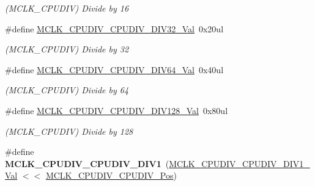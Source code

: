\begin{DoxyCompactItemize}
\begin{DoxyCompactList}\small\item\em (M\+C\+L\+K\+\_\+\+C\+P\+U\+D\+I\+V) Divide by 16 \end{DoxyCompactList}\item 
\hypertarget{group___s_a_m_l21___m_c_l_k_ga448a4c4d751ee50c5d4b5ba090e1b59a}{}\#define \hyperlink{group___s_a_m_l21___m_c_l_k_ga448a4c4d751ee50c5d4b5ba090e1b59a}{M\+C\+L\+K\+\_\+\+C\+P\+U\+D\+I\+V\+\_\+\+C\+P\+U\+D\+I\+V\+\_\+\+D\+I\+V32\+\_\+\+Val}~0x20ul\label{group___s_a_m_l21___m_c_l_k_ga448a4c4d751ee50c5d4b5ba090e1b59a}

\begin{DoxyCompactList}\small\item\em (M\+C\+L\+K\+\_\+\+C\+P\+U\+D\+I\+V) Divide by 32 \end{DoxyCompactList}\item 
\hypertarget{group___s_a_m_l21___m_c_l_k_gaac6c3fe67fb4444a6514401b65749a0e}{}\#define \hyperlink{group___s_a_m_l21___m_c_l_k_gaac6c3fe67fb4444a6514401b65749a0e}{M\+C\+L\+K\+\_\+\+C\+P\+U\+D\+I\+V\+\_\+\+C\+P\+U\+D\+I\+V\+\_\+\+D\+I\+V64\+\_\+\+Val}~0x40ul\label{group___s_a_m_l21___m_c_l_k_gaac6c3fe67fb4444a6514401b65749a0e}

\begin{DoxyCompactList}\small\item\em (M\+C\+L\+K\+\_\+\+C\+P\+U\+D\+I\+V) Divide by 64 \end{DoxyCompactList}\item 
\hypertarget{group___s_a_m_l21___m_c_l_k_ga1823f80244b12bdfd6a2c0b2b5aad95c}{}\#define \hyperlink{group___s_a_m_l21___m_c_l_k_ga1823f80244b12bdfd6a2c0b2b5aad95c}{M\+C\+L\+K\+\_\+\+C\+P\+U\+D\+I\+V\+\_\+\+C\+P\+U\+D\+I\+V\+\_\+\+D\+I\+V128\+\_\+\+Val}~0x80ul\label{group___s_a_m_l21___m_c_l_k_ga1823f80244b12bdfd6a2c0b2b5aad95c}

\begin{DoxyCompactList}\small\item\em (M\+C\+L\+K\+\_\+\+C\+P\+U\+D\+I\+V) Divide by 128 \end{DoxyCompactList}\item 
\hypertarget{group___s_a_m_l21___m_c_l_k_ga7d988d86c47f82a9d8ffc47c4ff5dd56}{}\#define {\bfseries M\+C\+L\+K\+\_\+\+C\+P\+U\+D\+I\+V\+\_\+\+C\+P\+U\+D\+I\+V\+\_\+\+D\+I\+V1}~(\hyperlink{group___s_a_m_l21___m_c_l_k_gaaae3ea7bacfd57d32b6f68c9de98152e}{M\+C\+L\+K\+\_\+\+C\+P\+U\+D\+I\+V\+\_\+\+C\+P\+U\+D\+I\+V\+\_\+\+D\+I\+V1\+\_\+\+Val}   $<$$<$ \hyperlink{group___s_a_m_l21___m_c_l_k_gae6faf0af5e1e22725e3c3080e2b94af7}{M\+C\+L\+K\+\_\+\+C\+P\+U\+D\+I\+V\+\_\+\+C\+P\+U\+D\+I\+V\+\_\+\+Pos})\label{group___s_a_m_l21___m_c_l_k_ga7d988d86c47f82a9d8ffc47c4ff5dd56}


\end{DoxyCompactItemize}
